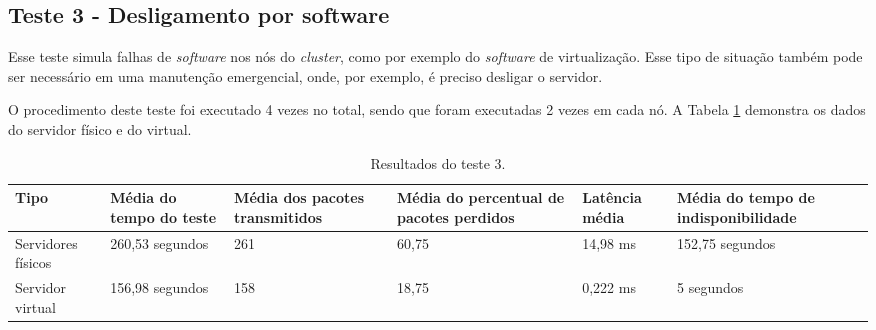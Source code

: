 

\subsection{Teste 3 - Desligamento por software}

Esse teste simula falhas de \textit{software} nos nós do \textit{cluster}, como por exemplo do \textit{software} de virtualização. Esse tipo de 
situação também pode ser necessário em uma manutenção emergencial, onde, por exemplo, é preciso desligar o servidor.


O procedimento deste teste foi executado 4 vezes no total, sendo que foram executadas 2 vezes em cada nó. A Tabela \ref{tab:teste3resultados}
demonstra os dados do servidor físico e do virtual.

\begin{table}[h!]
\caption{Resultados do teste 3.}
\label{tab:teste3resultados}
\begin{center}
\begin{tabular}{|l|p{2.2cm}|p{2.5cm}|p{2.5cm}|p{1.5cm}|p{3cm}|}\hline
\textbf{Tipo} & \textbf{Média do tempo do teste} & \textbf{Média dos pacotes transmitidos} & \textbf{Média do percentual de pacotes perdidos} & \textbf{Latência média} & \textbf{Média do tempo de indisponibilidade} \\\hline
Servidores físicos & 260,53 segundos & 261 & 60,75 & 14,98 ms & 152,75 segundos \\\hline
Servidor virtual & 156,98 segundos & 158 & 18,75 & 0,222 ms & 5 segundos \\\hline
\end{tabular}
\end{center}
\end{table}

